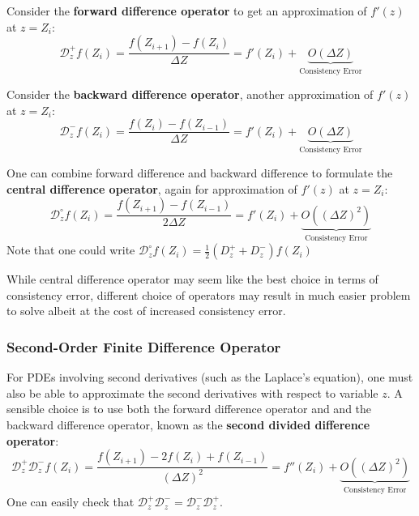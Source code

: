 \documentclass[../dissertation.tex]{subfiles}
\begin{document}
Consider the \textbf{forward difference operator} to get an approximation of $f'(z)$ at $z = Z_i$:
\begin{equation}
    \mathcal{D}_z^+ f \left( Z_i \right) = \frac{f \left( Z_{i+1} \right) - f\left( Z_i \right)}{\Delta Z} = f'\left( Z_i \right) + \underbrace{O \left( \Delta Z \right)}_{\text{Consistency Error}}
\end{equation}

Consider the \textbf{backward difference operator}, another approximation of $f'(z)$ at $z = Z_i$:
\begin{equation}
    \mathcal{D}_z^- f \left( Z_i \right) = \frac{f \left( Z_i \right) - f\left( Z_{i-1} \right)}{\Delta Z} = f'\left( Z_i \right) + \underbrace{O \left( \Delta Z \right)}_{\text{Consistency Error}}
\end{equation}

One can combine forward difference and backward difference to formulate the \textbf{central difference operator}, again for approximation of $f'(z)$ at $z = Z_i$:
\begin{equation}
    \mathcal{D}_z^\circ f \left( Z_i \right) = \frac{f \left( Z_{i+1} \right) - f\left( Z_{i-1} \right)}{2 \Delta Z} = f'\left( Z_i \right) + \underbrace{O \left( \left( \Delta Z \right)^2 \right)}_{\text{Consistency Error}}
\end{equation}
Note that one could write $\mathcal{D}_z^\circ f \left( Z_i \right) = \frac{1}{2}\left( D_z^+ + D_z^- \right) f \left( Z_i \right) $

While central difference operator may seem like the best choice in terms of consistency error,
different choice of operators may result in much easier problem to solve albeit at the cost of increased consistency error.

\subsubsection{Second-Order Finite Difference Operator}
For PDEs involving second derivatives (such as the Laplace's equation), one must also be able to approximate the second derivatives with respect to variable $z$.
A sensible choice is to use both the forward difference operator and and the backward difference operator, known as the \textbf{second divided difference operator}:
\begin{equation}
    \mathcal{D}_z^+ \mathcal{D}_z^- f \left( Z_i \right) = \frac{f \left( Z_{i+1} \right) - 2 f \left( Z_i \right) + f \left( Z_{i-1} \right)}{\left( \Delta Z \right)^2} = f''\left( Z_i \right) + \underbrace{O \left( \left( \Delta Z \right)^2 \right)}_{\text{Consistency Error}}
\end{equation}
One can easily check that $\mathcal{D}_z^+ \mathcal{D}_z^- = \mathcal{D}_z^- \mathcal{D}_z^+$.
\end{document}
